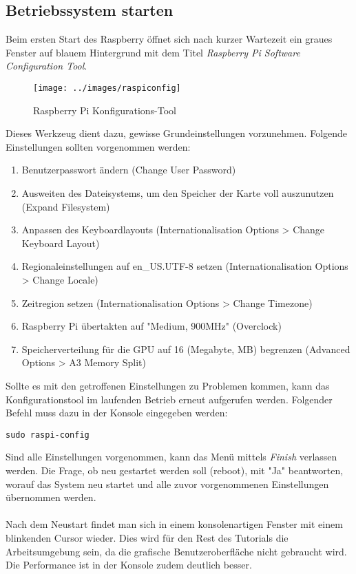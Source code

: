 \subsection{Betriebssystem starten}
Beim ersten Start des Raspberry öffnet sich nach kurzer Wartezeit ein graues Fenster auf blauem Hintergrund mit dem Titel \textit{Raspberry Pi Software Configuration Tool}.

\begin{figure}[h]
\centering
\texttt{[image: ../images/raspiconfig]}
\caption{Raspberry Pi Konfigurations-Tool}
\end{figure}

Dieses Werkzeug dient dazu, gewisse Grundeinstellungen vorzunehmen. Folgende Einstellungen sollten vorgenommen werden:

\begin{enumerate}
\item Benutzerpasswort ändern (Change User Password)
\item Ausweiten des Dateisystems, um den Speicher der Karte voll auszunutzen (Expand Filesystem)
\item Anpassen des Keyboardlayouts (Internationalisation Options > Change Keyboard Layout)
\item Regionaleinstellungen auf en\_US.UTF-8 setzen (Internationalisation Options > Change Locale)
\item Zeitregion setzen (Internationalisation Options > Change Timezone)
\item Raspberry Pi übertakten auf "Medium, 900MHz" (Overclock)
\item Speicherverteilung für die GPU auf 16 (Megabyte, MB) begrenzen (Advanced Options > A3 Memory Split)
\end{enumerate}

Sollte es mit den getroffenen Einstellungen zu Problemen kommen, kann das Konfigurationstool im laufenden Betrieb erneut aufgerufen werden. Folgender Befehl muss dazu in der Konsole eingegeben werden:

\begin{lstlisting}
sudo raspi-config
\end{lstlisting}

Sind alle Einstellungen vorgenommen, kann das Menü mittels \textit{Finish} verlassen werden. Die Frage, ob neu gestartet werden soll (reboot), mit "Ja" beantworten, worauf das System neu startet und alle zuvor vorgenommenen Einstellungen übernommen werden.
\\
\\
Nach dem Neustart findet man sich in einem konsolenartigen Fenster mit einem blinkenden Cursor wieder. Dies wird für den Rest des Tutorials die Arbeitsumgebung sein, da die grafische Benutzeroberfläche nicht gebraucht wird. Die Performance ist in der Konsole zudem deutlich besser.

